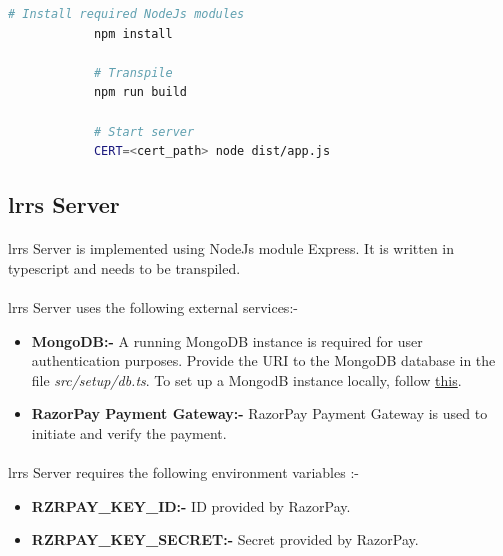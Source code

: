 \documentclass[12pt]{article}
\begin{document}
        \begin{lstlisting}[language=bash, caption=Verification Server]
            # Install required NodeJs modules
            npm install
        
            # Transpile
            npm run build
        
            # Start server
            CERT=<cert_path> node dist/app.js
            \end{lstlisting}
    
    \subsection{\acrshort{lrrs} Server}
        \paragraph{}
        \acrshort{lrrs} Server is implemented using NodeJs module Express. It is written in typescript and needs to be transpiled.
    
        \paragraph{}
        \acrshort{lrrs} Server uses the following external services:-
        \begin{itemize}
            \item \textbf{MongoDB:-} A running MongoDB instance is required for user authentication purposes. Provide the URI to the MongoDB database in the file \textit{src/setup/db.ts}. To set up a MongodB instance locally, follow \href{https://docs.mongodb.com/manual/installation/}{this}.
            \item \textbf{RazorPay Payment Gateway:-} RazorPay Payment Gateway is used to initiate and verify the payment.
        \end{itemize}
    
        \paragraph{}
        \acrshort{lrrs} Server requires the following environment variables :-
        \begin{itemize}
            \item \textbf{RZRPAY\_KEY\_ID:-} ID provided by RazorPay.
            \item \textbf{RZRPAY\_KEY\_SECRET:-} Secret provided by RazorPay.
        \end{itemize}
        
\end{document}
